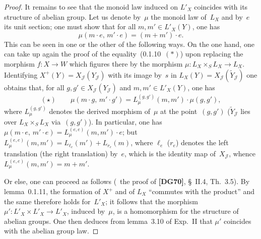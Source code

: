 \begin{proof}
It remains to see that the monoid law induced on \(L'_{X}\) coincides with
its structure of abelian group. Let us denote by~\(\mu\) the monoid law
of~\(L_{X}\) and by~\(e\) its unit section; one must show that for all
\(m,m'\in L'_{X}(Y)\), one has
\[
\mu(m\cdot e,\,m'\cdot e)=(m+m')\cdot e.
\]
This can be seen in one or the other of the following ways. On the one hand,
one can take up again the proof of the equality~(0.1.10~\((\ast)\)) upon
replacing the morphism \(f\colon X\to W\) which figures there by the morphism
\(\mu\colon L_{X}\times_{S}L_{X}\to L_{X}\). Identifying
\(X^{+}(Y)=X_{\mathcal{J}}(Y_{\mathcal{J}})\) with its image by~\(s\) in
\(L_{X}(Y)=X_{\mathcal{J}}(\widetilde{Y}_{\mathcal{J}})\) one obtains that,
for all \(g,g'\in X_{\mathcal{J}}(Y_{\mathcal{J}})\) and
\(m,m'\in L'_{X}(Y)\), one has
\begin{equation*}
(\star)\qquad
\mu(m\cdot g,\,m'\cdot g')
=
L_{\mu}^{(g,g')}(m,m')\cdot\mu(g,g'),
\end{equation*}
where \(L_{\mu}^{(g,g')}\) denotes the derived morphism of~\(\mu\) at the
point~\((g,g')\) (\ie \(\widetilde{Y}_{\mathcal{J}}\) lies over
\(L_{X}\times_{S}L_{X}\) via~\((g,g')\)). In particular, one has
\(\mu(m\cdot e,\,m'\cdot e)=L_{\mu}^{(e,e)}(m,m')\cdot e\); but
\(L_{\mu}^{(e,e)}(m,m')=L_{\ell_{e}}(m')+L_{r_{e}}(m)\), where \(\ell_{e}\)
(\resp \(r_{e}\)) denotes the left translation (\resp the right translation)
by~\(e\), which is the identity map of~\(X_{\mathcal{J}}\), whence
\(L_{\mu}^{(e,e)}(m,m')=m+m'\).

Or else, one can proceed as follows (\cf\ the proof of \textbf{[DG70]},
\S~II.4, Th.~3.5). By lemma~0.1.11, the formation of \(X^{+}\) and of
\(L_{X}\) ``commutes with the product''
and the same therefore holds for~\(L'_{X}\); it follows that the morphism
\(\mu'\colon L'_{X}\times L'_{X}\to L'_{X}\), induced by~\(\mu\), is a
homomorphism for the structure of abelian groups. One then deduces from
lemma~3.10 of Exp.~II that \(\mu'\) coincides with the abelian group law.
\end{proof}

